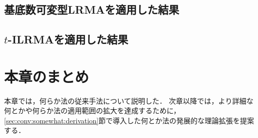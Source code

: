 \subsection{基底数可変型LRMAを適用した結果}
\label{sec:conv:somewhat}

\subsection{$t$-ILRMAを適用した結果}
\label{sec:conv:somewhat}

\section{本章のまとめ}
本章では，何らか法の従来手法について説明した．
次章以降では，より詳細な何とかや何らか法の適用範囲の拡大を達成するために，
\ref{sec:conv:somewhat:derivation}節で導入した何とか法の発展的な理論拡張を提案する．

